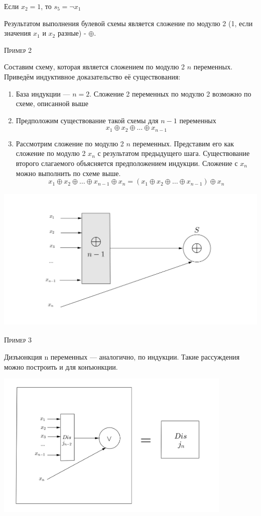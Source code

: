 \documentclass[a4paper, 12pt]{article}
\begin{document}
 Если $x_2 = 1$, то $s_5 = \lnot x_1$
 
 Результатом выполнения булевой схемы является сложение по модулю 2 (1, если значения $x_1$ и $x_2$ разные) - $\oplus$.
 
 \textsc{Пример 2}
 
 Составим схему, которая является сложением по модулю 2 $n$ переменных. Приведём индуктивное доказательство её существования: 
 
 \begin{enumerate}
     \item База индукции --- $n = 2$. Сложение 2 переменных по модулю 2 возможно по схеме, описанной выше
     \item Предположим существование такой схемы для $n - 1$ переменных 
     \[x_1 \oplus x_2 \oplus \ldots \oplus x_{n-1}\]
     \item Рассмотрим сложение по модулю 2 $n$ переменных. Представим его как сложение по модулю 2 $x_n$ с результатом предыдущего шага. Существование второго слагаемого объясняется предположением индукции. Сложение с $x_n$ можно выполнить по схеме выше. 
     \[x_1 \oplus x_2 \oplus \ldots \oplus x_{n-1} \oplus x_n = (x_1 \oplus x_2 \oplus \ldots \oplus x_{n-1}) \oplus x_n\]
 \end{enumerate}
\includegraphics[height=7cm]{images/2.png}
 
 \textsc{Пример 3}
 
 Дизъюнкция n переменных --- аналогично, по индукции. Такие рассуждения можно построить и для конъюнкции.
 
 \includegraphics[height=7cm]{images/3.png}
\end{document}
